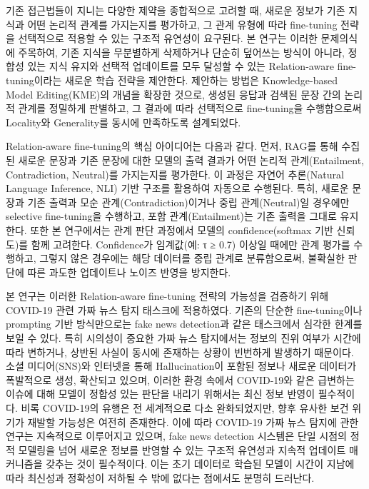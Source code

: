 \documentclass[a4paper,fleqn]{cas-sc}
\begin{document}
기존 접근법들이 지니는 다양한 제약을 종합적으로 고려할 때, 새로운 정보가 기존 지식과 어떤 논리적 관계를 가지는지를 평가하고, 그 관계 유형에 따라 fine-tuning 전략을 선택적으로 적용할 수 있는 구조적 유연성이 요구된다. 본 연구는 이러한 문제의식에 주목하여, 기존 지식을 무분별하게 삭제하거나 단순히 덮어쓰는 방식이 아니라, 정합성 있는 지식 유지와 선택적 업데이트를 모두 달성할 수 있는 Relation-aware fine-tuning이라는 새로운 학습 전략을 제안한다. 
제안하는 방법은 Knowledge-based Model Editing(KME)의 개념을 확장한 것으로, 생성된 응답과 검색된 문장 간의 논리적 관계를 정밀하게 판별하고, 그 결과에 따라 선택적으로 fine-tuning을 수행함으로써 Locality와 Generality를 동시에 만족하도록 설계되었다.

Relation-aware fine-tuning의 핵심 아이디어는 다음과 같다.
먼저, RAG를 통해 수집된 새로운 문장과 기존 문장에 대한 모델의 출력 결과가 어떤 논리적 관계(Entailment, Contradiction, Neutral)를 가지는지를 평가한다.
이 과정은 자연어 추론(Natural Language Inference, NLI) 기반 구조를 활용하여 자동으로 수행된다.
특히, 새로운 문장과 기존 출력과 모순 관계(Contradiction)이거나 중립 관계(Neutral)일 경우에만 selective fine-tuning을 수행하고, 포함 관계(Entailment)는 기존 출력을 그대로 유지한다.
또한 본 연구에서는 관계 판단 과정에서 모델의 confidence(softmax 기반 신뢰도)를 함께 고려한다. 
Confidence가 임계값(예: τ ≥ 0.7) 이상일 때에만 관계 평가를 수행하고, 그렇지 않은 경우에는 해당 데이터를 중립 관계로 분류함으로써, 불확실한 판단에 따른 과도한 업데이트나 노이즈 반영을 방지한다.

본 연구는 이러한 Relation-aware fine-tuning 전략의 가능성을 검증하기 위해 COVID-19 관련 가짜 뉴스 탐지 태스크에 적용하였다. 
기존의 단순한 fine-tuning이나 prompting 기반 방식만으로는 fake news detection과 같은 태스크에서 심각한 한계를 보일 수 있다. 특히 시의성이 중요한 가짜 뉴스 탐지에서는 정보의 진위 여부가 시간에 따라 변하거나, 상반된 사실이 동시에 존재하는 상황이 빈번하게 발생하기 때문이다.
소셜 미디어(SNS)와 인터넷을 통해 Hallucination이 포함된 정보나 새로운 데이터가 폭발적으로 생성, 확산되고 있으며, 이러한 환경 속에서 COVID-19와 같은 급변하는 이슈에 대해 모델이 정합성 있는 판단을 내리기 위해서는 최신 정보 반영이 필수적이다. 비록 COVID-19의 유행은 전 세계적으로 다소 완화되었지만, 향후 유사한 보건 위기가 재발할 가능성은 여전히 존재한다.
이에 따라 COVID-19 가짜 뉴스 탐지에 관한 연구는 지속적으로 이루어지고 있으며, fake news detection 시스템은 단일 시점의 정적 모델링을 넘어 새로운 정보를 반영할 수 있는 구조적 유연성과 지속적 업데이트 매커니즘을 갖추는 것이 필수적이다. 이는 초기 데이터로 학습된 모델이 시간이 지남에 따라 최신성과 정확성이 저하될 수 밖에 없다는 점에서도 분명히 드러난다.
\end{document}
